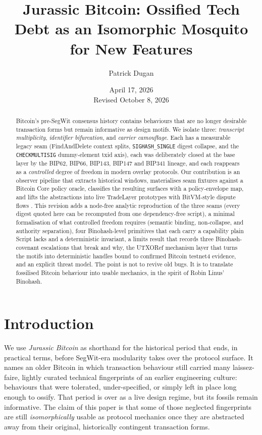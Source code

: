 \documentclass[11pt]{article}
\title{Jurassic Bitcoin: Ossified Tech Debt as an Isomorphic Mosquito for New Features}
\author{Patrick Dugan}
\date{April 17, 2026\\\small Revised October 8, 2026}
\begin{document}
\maketitle

\begin{abstract}
Bitcoin's pre-SegWit consensus history contains behaviours that are no longer
desirable transaction forms but remain informative as design motifs. We isolate
three: \emph{transcript multiplicity}, \emph{identifier bifurcation}, and
\emph{carrier camouflage}. Each has a measurable legacy seam (FindAndDelete
context splits, \texttt{SIGHASH\_SINGLE} digest collapse, and the
\texttt{CHECKMULTISIG} dummy-element txid axis), each was deliberately closed at
the base layer by the BIP62, BIP66, BIP143, BIP147 and BIP341 lineage, and each
reappears as a \emph{controlled} degree of freedom in modern overlay protocols.
Our contribution is an observer pipeline that extracts historical windows,
materialises seam fixtures against a Bitcoin Core policy oracle, classifies the
resulting surfaces with a policy-envelope map, and lifts the abstractions into
live TradeLayer prototypes with BitVM-style dispute flows
\cite{linus2023bitvm,linus2025bitvm2,linus2026binohash,yang2021fluffy,kim2025fork}.
This revision adds a node-free analytic reproduction of the three seams (every
digest quoted here can be recomputed from one dependency-free script), a minimal
formalisation of what controlled freedom requires (semantic binding,
non-collapse, and authority separation), four Binohash-level primitives that
each carry a capability plain Script lacks and a deterministic invariant, a
limits result that records three Binohash-covenant escalations that break and
why, the UTXORef mechanism layer that turns the motifs into deterministic
handles bound to confirmed Bitcoin testnet4 evidence, and an explicit threat
model. The point is not to revive old bugs. It
is to translate fossilised Bitcoin behaviour into usable mechanics, in the
spirit of Robin Linus' Binohash.
\end{abstract}

\section{Introduction}

We use \emph{Jurassic Bitcoin} as shorthand for the historical period that
ends, in practical terms, before SegWit-era modularity takes over the protocol
surface. It names an older Bitcoin in which transaction behaviour still carried
many laissez-faire, lightly curated technical fingerprints of an earlier
engineering culture: behaviours that were tolerated, under-specified, or simply
left in place long enough to ossify. That period is over as a live design
regime, but its fossils remain informative. The claim of this paper is that some
of those neglected fingerprints are still \emph{isomorphically} usable as
protocol mechanics once they are abstracted away from their original,
historically contingent transaction forms.
\end{document}
